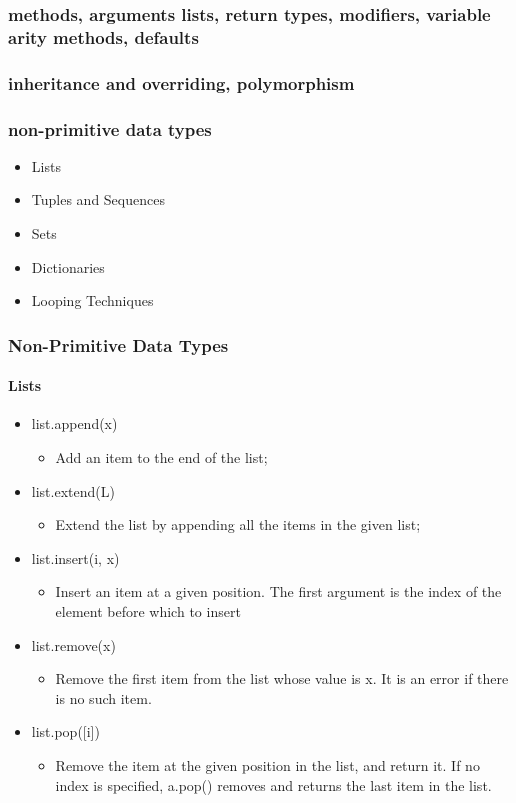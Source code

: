 \documentclass{beamer}
\begin{document}
\begin{frame}[fragile]
\frametitle{methods, arguments lists, return types, modifiers, variable arity methods, defaults}
\framesubtitle{}

\end{frame}

\begin{frame}[fragile]
\frametitle{inheritance and overriding, polymorphism}
\framesubtitle{}

\end{frame}

\begin{frame}[fragile]
\frametitle{non-primitive data types}
\begin{itemize}
	\item Lists
	\item Tuples and Sequences
	\item Sets
	\item Dictionaries
	\item Looping Techniques
\end{itemize}
\framesubtitle{}

\end{frame}

\begin{frame}[fragile]
\frametitle{Non-Primitive Data Types}
\framesubtitle{Lists}
\begin{itemize}
	\item list.append(x)
		\begin{itemize}
		\item Add an item to the end of the list;
		\end{itemize}
	\item list.extend(L)
		\begin{itemize}
		\item Extend the list by appending all the items in the given list; 		\end{itemize}

	\item list.insert(i, x)
		\begin{itemize}
		\item Insert an item at a given position. The first argument is the 				index of the element before which to insert
		\end{itemize}

	\item list.remove(x)
		\begin{itemize}
		\item Remove the first item from the list whose value is x. It is an 				error if there is no such item.
		\end{itemize}

	\item list.pop([i])
		\begin{itemize}
		\item 	Remove the item at the given position in the list, and 					return it. If no index is specified, a.pop() removes and 					returns the last item in the list. 
		\end{itemize}

\end{itemize}


\end{frame}
\end{document}
